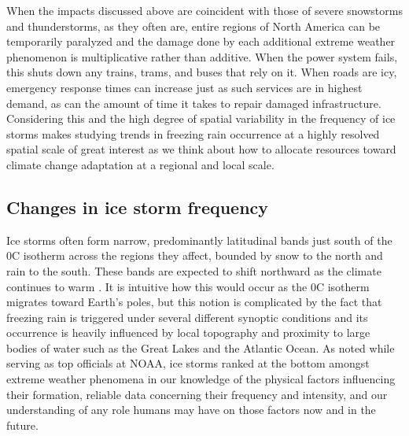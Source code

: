 \documentclass[twocol]{ametsoc}
\begin{document}
When the impacts discussed above are coincident with those of severe snowstorms and thunderstorms, as they often are, entire regions of North America can be temporarily paralyzed and the damage done by each additional extreme weather phenomenon is multiplicative rather than additive. When the power system fails, this shuts down any trains, trams, and buses that rely on it. When roads are icy, emergency response times can increase just as such services are in highest demand, as can the amount of time it takes to repair damaged infrastructure. Considering this and the high degree of spatial variability in the frequency of ice storms makes studying trends in freezing rain occurrence at a highly resolved spatial scale of great interest as we think about how to allocate resources toward climate change adaptation at a regional and local scale.

\subsection{Changes in ice storm frequency}
Ice storms often form narrow, predominantly latitudinal bands just south of the 0\degree C isotherm across the regions they affect, bounded by snow to the north and rain to the south. These bands are expected to shift northward as the climate continues to warm \citep{cheng2011possible,lambert2011simulated}. It is intuitive how this would occur as the 0\degree C isotherm migrates toward Earth's poles, but this notion is complicated by the fact that freezing rain is triggered under several different synoptic conditions and its occurrence is heavily influenced by local topography and proximity to large bodies of water such as the Great Lakes and the Atlantic Ocean. As \citet{lubchenco2012extreme} noted while serving as top officials at NOAA, ice storms ranked at the bottom amongst extreme weather phenomena in our knowledge of the physical factors influencing their formation, reliable data concerning their frequency and intensity, and our understanding of any role humans may have on those factors now and in the future.
\end{document}
